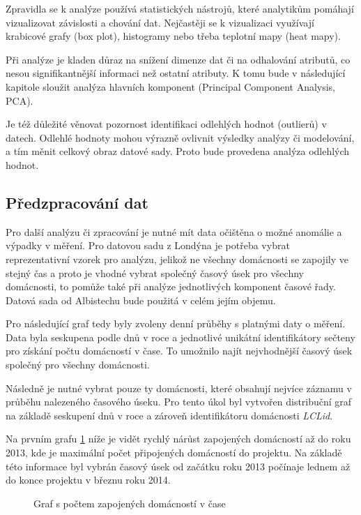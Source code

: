 \documentclass[FM,BP,fonts]{tulthesis}
\begin{document}
Zpravidla se k analýze používá statistických nástrojů, které analytikům pomáhají vizualizovat závislosti a chování dat. Nejčastěji se k vizualizaci využívají krabicové grafy (box plot), histogramy nebo třeba teplotní mapy (heat mapy). 

Při analýze je kladen důraz na snížení dimenze dat či na odhalování atributů, co nesou signifikantnější informaci než ostatní atributy. K tomu bude v následující kapitole sloužit analýza hlavních komponent (Principal Component Analysis, PCA). 

Je též důležité věnovat pozornost identifikaci odlehlých hodnot (outlierů) v datech. Odlehlé hodnoty mohou výrazně ovlivnit výsledky analýzy či modelování, a tím měnit celkový obraz datové sady. Proto bude provedena analýza odlehlých hodnot.


\subsection{Předzpracování dat}\label{preprocess}
Pro další analýzu či zpracování je nutné mít data očištěna o možné anomálie a výpadky v měření. Pro datovou sadu z Londýna je potřeba vybrat reprezentativní vzorek pro analýzu, jelikož ne všechny domácnosti se zapojily ve stejný čas a proto je vhodné vybrat společný časový úsek pro všechny domácnosti, to pomůže také při analýze jednotlivých komponent časové řady. Datová sada od Albistechu bude použitá v celém jejím objemu. 

Pro následující graf tedy byly zvoleny denní průběhy s platnými daty o měření. Data byla seskupena podle dnů v roce a jednotlivé unikátní identifikátory sečteny pro získání počtu domácností v čase. To umožnilo najít nejvhodnější časový úsek společný pro všechny domácnosti.

Následně je nutné vybrat pouze ty domácnosti, které obsahují nejvíce záznamu v průběhu nalezeného časového úseku. Pro tento úkol byl vytvořen distribuční graf na základě seskupení dnů v roce a zároveň identifikátoru domácnosti \textit{LCLid}.

Na prvním grafu \ref{fig:domacnosti-v-case} níže je vidět rychlý nárůst zapojených domácností až do roku 2013, kde je maximální počet připojených domácností do projektu. Na základě této informace byl vybrán časový úsek od začátku roku 2013 počínaje lednem až do konce projektu v březnu roku 2014.


\begin{figure}[htbp]
	\centering
	\caption{Graf s počtem zapojených domácností v čase }
	\label{fig:domacnosti-v-case}
\end{figure}
\end{document}
